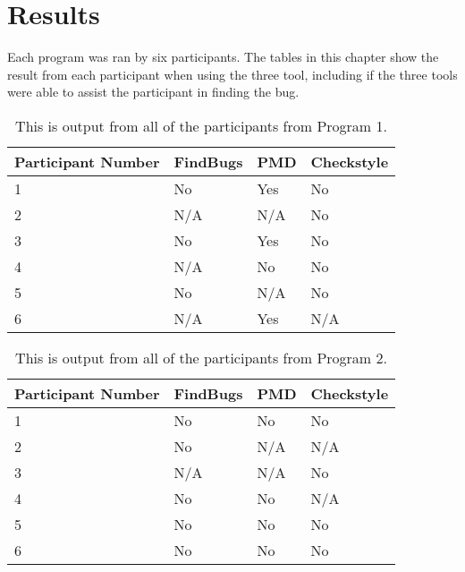 \section{Results}

Each program was ran by six participants. The tables in this chapter show the result from each participant when using the three tool, including if the three tools were able to assist the participant in finding the bug. 

\begin{table}
\begin{center}
	\begin{tabular}{| l | l | l | l |}
		\hline
		Participant Number & FindBugs & PMD & Checkstyle\\ \hline
		1 & No & Yes & No \\ \hline
		2 & N/A & N/A & No \\ \hline
		3 & No & Yes & No \\ \hline
		4 & N/A & No & No \\ \hline
		5 & No & N/A & No \\ \hline
		6 & N/A & Yes & N/A \\ \hline
	\end{tabular}
	\caption{This is output from all of the participants from Program 1.}
\end{center}
\end{table}


\begin{table}
\begin{center}
	\begin{tabular}{| l | l | l | l |}
		\hline
		Participant Number & FindBugs & PMD & Checkstyle \\ \hline
		1 & No & No & No \\ \hline
		2 & No & N/A & N/A \\ \hline
		3 & N/A & N/A & No \\ \hline
		4 & No & No & N/A \\ \hline
		5 & No & No & No \\ \hline
		6 & No & No & No \\ \hline
	\end{tabular}
	\caption{This is output from all of the participants from Program 2.}
\end{center}
\end{table}


